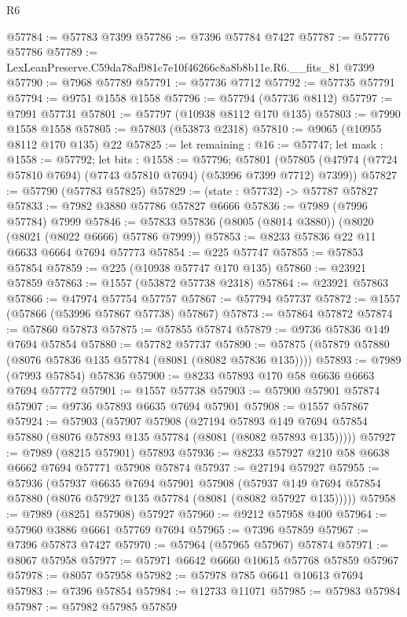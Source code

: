 \begin{lexlean}{R6}
\begin{coremodule}
@57784 := @57783 @7399
@57786 := @7396 @57784 @7427
@57787 := @57776 @57786
@57789 := LexLeanPreserve.C59da78af981c7e10f46266c8a8b8b11e.R6.__fits_81 @7399
@57790 := @7968 @57789
@57791 := @57736 @7712
@57792 := @57735 @57791
@57794 := @9751 @1558 @1558
@57796 := @57794 (@57736 @8112)
@57797 := @7991 @57731
@57801 := @57797 (@10938 @8112 @170 @135)
@57803 := @7990 @1558 @1558
@57805 := @57803 (@53873 @2318)
@57810 := @9065 (@10955 @8112 @170 @135) @22
@57825 := let remaining : @16 := @57747;
  let mask : @1558 := @57792;
  let bits : @1558 := @57796;
  @57801 (@57805 (@47974 (@7724 @57810 @7694) (@7743 @57810 @7694) (@53996 @7399 @7712) @7399))
@57827 := @57790 (@57783 @57825)
@57829 := (state : @57732) -> @57787 @57827
@57833 := @7982 @3880 @57786 @57827 @6666
@57836 := @7989 (@7996 @57784) @7999
@57846 := @57833 @57836 (@8005 (@8014 @3880)) (@8020 (@8021 (@8022 @6666) @57786 @7999))
@57853 := @8233 @57836 @22 @11 @6633 @6664 @7694 @57773
@57854 := @225 @57747
@57855 := @57853 @57854
@57859 := @225 (@10938 @57747 @170 @135)
@57860 := @23921 @57859
@57863 := @1557 (@53872 @57738 @2318)
@57864 := @23921 @57863
@57866 := @47974 @57754 @57757
@57867 := @57794 @57737
@57872 := @1557 (@57866 (@53996 @57867 @57738) @57867)
@57873 := @57864 @57872
@57874 := @57860 @57873
@57875 := @57855 @57874
@57879 := @9736 @57836 @149 @7694 @57854
@57880 := @57782 @57737
@57890 := @57875 (@57879 @57880 (@8076 @57836 @135 @57784 (@8081 (@8082 @57836 @135))))
@57893 := @7989 (@7993 @57854) @57836
@57900 := @8233 @57893 @170 @58 @6636 @6663 @7694 @57772
@57901 := @1557 @57738
@57903 := @57900 @57901 @57874
@57907 := @9736 @57893 @6635 @7694 @57901
@57908 := @1557 @57867
@57924 := @57903
    (@57907
      @57908
      (@27194
        @57893
        @149
        @7694
        @57854
        @57880
        (@8076 @57893 @135 @57784 (@8081 (@8082 @57893 @135)))))
@57927 := @7989 (@8215 @57901) @57893
@57936 := @8233 @57927 @210 @58 @6638 @6662 @7694 @57771 @57908 @57874
@57937 := @27194 @57927
@57955 := @57936
    (@57937
      @6635
      @7694
      @57901
      @57908
      (@57937 @149 @7694 @57854 @57880 (@8076 @57927 @135 @57784 (@8081 (@8082 @57927 @135)))))
@57958 := @7989 (@8251 @57908) @57927
@57960 := @9212 @57958 @400
@57964 := @57960 @3886 @6661 @57769 @7694
@57965 := @7396 @57859
@57967 := @7396 @57873 @7427
@57970 := @57964 (@57965 @57967) @57874
@57971 := @8067 @57958
@57977 := @57971 @6642 @6660 @10615 @57768 @57859 @57967
@57978 := @8057 @57958
@57982 := @57978 @785 @6641 @10613 @7694
@57983 := @7396 @57854
@57984 := @12733 @11071
@57985 := @57983 @57984
@57987 := @57982 @57985 @57859

\end{coremodule}
\end{lexlean}
